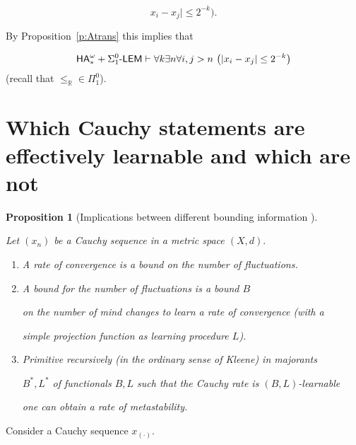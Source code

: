 \documentclass[1p]{elsarticle}
\newcommand{\usftext}[1]{\textsf{\upshape #1}}
\newcommand{\RR}{\ensuremath{\mathbb{R}}}
\newcommand{\ha}{\ensuremath{{\usftext{HA}}^\omega}} %
\newcommand{\LEM}{\ensuremath{\Sigma^0_1\usftext{-LEM}}}
\theoremstyle{plain}
\newtheorem{prop}[thm]{Proposition}
\theoremstyle{definition}
\theoremstyle{remark}
\renewenvironment{proof}[1][]{\noindent{\bf Proof{#1}. }}{\nopagebreak[4]{\hspace*{\fill}


  $\Box$              %

 }{\vspace{2ex}}}
\theoremstyle{definition}
\begin{document}
{\begin{proof}
\[x_i - x_j| \leq 2^{-k}\big). \]

By Proposition~\ref{p:Atrans} this implies that

\[ \ha_*+\LEM\vdash \forall k\exists n\forall i,j>n\ \big(| x_i - x_j| 

\leq 2^{-k}\big) \] (recall that $\le_{\RR}\in\Pi^0_1$).

\end{proof}



\section{Which Cauchy statements are effectively learnable and which are not}



\begin{prop}[Implications between different bounding information 

for Cauchy statements] \label{prop.hierarchy}

Let $(x_n)$ be a Cauchy sequence in a metric space $(X,d).$ 

\begin{enumerate}

\item A rate of convergence is a bound on the number of fluctuations.

\item A bound for the number of fluctuations is a bound $B$ 

on the number of mind changes to learn a rate of convergence (with a  

simple projection function as learning procedure $L$).

\item 

Primitive recursively (in the ordinary sense of Kleene) in majorants 

$B^*,L^*$ of functionals $B,L$ such that the Cauchy rate is $(B,L)$-learnable 

one can obtain a rate of metastability. 

\end{enumerate}

\end{prop}

\begin{proof}

Consider a Cauchy sequence $x_{(\cdot)}$.

\begin{enumerate}


\end{enumerate}
\end{proof}}
\end{document}
